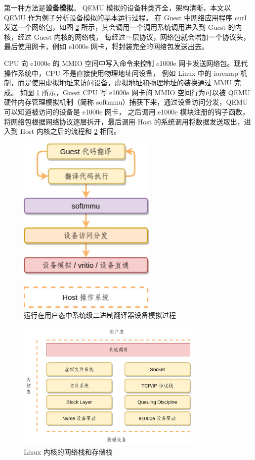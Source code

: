第一种方法是\textbf{设备模拟}。
QEMU 模拟的设备种类齐全，架构清晰，本文以 QEMU 作为例子分析设备模拟的基本运行过程。
在 Guest 中网络应用程序 curl 发送一个网络包，如图 \ref{fig:kernel_stack} 所示，其会调用一个调用系统调用进入到 Guest 的内核，经过 Guest 内核的网络栈，
每经过一层协议，网络包就会增加一个协议头，最后使用网卡，例如 e1000e 网卡，将封装完全的网络包发送出去。

CPU 向 e1000e 的 MMIO 空间中写入命令来控制 e1000e 网卡发送网络包。现代操作系统中，CPU 不是直接使用物理地址问设备，
例如 Linux 中的 ioremap 机制，而是使用虚拟地址来访问设备，虚拟地址和物理地址的装换通过 MMU 完成。
如图 \ref{fig:qemu_device_user} 所示，Guest CPU 写 e1000e 网卡的 MMIO 空间行为可以被 QEMU 硬件内存管理模拟机制（简称 softmmu）捕获下来，通过设备访问分发，QEMU 可以知道被访问的设备是 e1000e 网卡，
之后调用 e1000e 模块注册的钩子函数，将网络包根据网络协议逐层拆开，最后调用 Host 的系统调用将数据发送取出，进入到 Host 内核之后的流程和 \ref{fig:kernel_stack} 相同。

\begin{figure}[!htbp]
	\centering
	\includegraphics[width=0.6\textwidth]{./images/device-virtualization.jpg}
	\caption{运行在用户态中系统级二进制翻译器设备模拟过程}
	\label{fig:qemu_device_user}
\end{figure}

\begin{figure}[!htbp]
	\centering
	\includegraphics[width=0.8\textwidth]{./images/linux-stack.jpg}
	\caption{Linux 内核的网络栈和存储栈}
	\label{fig:kernel_stack}
\end{figure}

